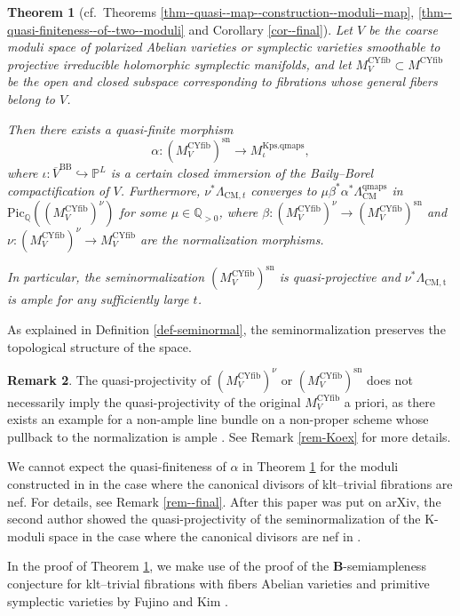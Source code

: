 \documentclass[12pt,twoside]{amsart}
\newtheorem{thm}{Theorem}[section]
\theoremstyle{definition}
\newtheorem{rem}[thm]{Remark}
\begin{document}
\begin{thm}[{cf.~Theorems \ref{thm--quasi--map--construction--moduli--map}, \ref{thm--quasi-finiteness--of--two--moduli} and Corollary \ref{cor--final}}]\label{main--thm--ii}
Let $V$ be the coarse moduli space of polarized Abelian varieties or symplectic varieties smoothable to projective irreducible holomorphic symplectic manifolds, and let $M^{\mathrm{CYfib}}_{V}\subset M^{\mathrm{CYfib}}$ be the open and closed subspace corresponding to fibrations whose general fibers belong to $V$.

Then there exists a quasi-finite morphism 
    \[
   \alpha\colon (M^{\mathrm{CYfib}}_{V})^{\mathrm{sn}}\to {M}^{\mathrm{Kps.qmaps}}_{\iota},
    \]
    where $\iota\colon \overline{V}^{\mathrm{BB}}\hookrightarrow\mathbb{P}^L$ is a certain closed immersion of the Baily--Borel compactification of $V$.
    Furthermore, $\nu^*\Lambda_{\mathrm{CM},t}$ converges to $\mu\beta^*\alpha^*\Lambda_{\mathrm{CM}}^{\mathrm{qmaps}}$ in $\mathrm{Pic}_{\mathbb{Q}}((M^{\mathrm{CYfib}}_{V})^\nu)$ for some $\mu\in\mathbb{Q}_{>0}$, where $\beta\colon (M^{\mathrm{CYfib}}_{V})^{\nu}\to(M^{\mathrm{CYfib}}_{V})^{\mathrm{sn}}$ and $\nu\colon(M^{\mathrm{CYfib}}_{V})^\nu\to  M^{\mathrm{CYfib}}_{V}$ are the normalization morphisms.

    In particular, the seminormalization $(M^{\mathrm{CYfib}}_{V})^{\mathrm{sn}}$ is quasi-projective and $\nu^*\Lambda_{\mathrm{CM,t}}$ is ample for any sufficiently large $t$.
\end{thm}

As explained in Definition \ref{def-seminormal}, the seminormalization preserves the topological structure of the space.

\begin{rem}
    The quasi-projectivity of $(M^{\mathrm{CYfib}}_{V})^\nu$ or $(M^{\mathrm{CYfib}}_{V})^{\mathrm{sn}}$ does not necessarily imply the quasi-projectivity of the original $M^{\mathrm{CYfib}}_{V}$ a priori, as there exists an example for a non-ample line bundle on a non-proper scheme whose pullback to the normalization is ample \cite[Proposition 2]{Koex}.
    See Remark \ref{rem-Koex} for more details.
    
    We cannot expect the quasi-finiteness of $\alpha$ in Theorem \ref{main--thm--ii} for the moduli constructed in \cite{HH} in the case where the canonical divisors of klt--trivial fibrations are nef.
For details, see Remark \ref{rem--final}.
After this paper was put on arXiv, the second author showed the quasi-projectivity of the seminormalization of the K-moduli space in the case where the canonical divisors are nef in \cite{Hat26}.

In the proof of Theorem \ref{main--thm--ii}, we make use of the proof of the $\mathbf{B}$-semiampleness conjecture for klt--trivial fibrations with fibers Abelian varieties and primitive symplectic varieties by Fujino \cite{fujino--canonical-certain} and Kim \cite{kim-can-bundle-formula}.
\end{rem}
\end{document}
